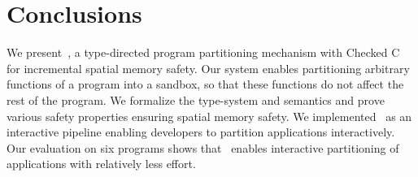 \section{Conclusions}
\label{sec:conclude}
We present~\systemname{}, a type-directed program partitioning mechanism with Checked C for incremental spatial memory safety.
Our system enables partitioning arbitrary functions of a program into a sandbox, so that these functions do not affect the rest of the program.
We formalize the type-system and semantics and prove various safety properties ensuring spatial memory safety.
We implemented~\systemname{} as an interactive pipeline enabling developers to partition applications interactively.
Our evaluation on six programs shows that~\systemname{} enables interactive partitioning of applications with relatively less effort.

%
